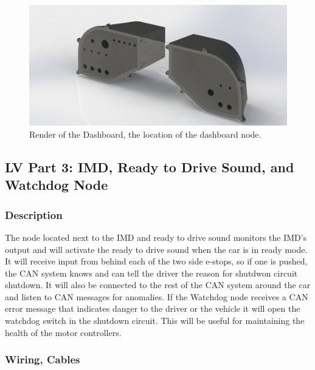 \documentclass{article}
\begin{document}
            \begin{figure}[H]
            \centering
            \includegraphics[width = 0.7 \textwidth]{Dashboard}
            \caption{Render of the Dashboard, the location of the dashboard node. }
            \label{dashboard}
            \end{figure}

    \subsection{LV Part 3: IMD, Ready to Drive Sound, and Watchdog Node} \label{imdnode}

        \subsubsection{Description}

            The node located next to the IMD and ready to drive sound monitors the IMD's output and will activate the ready to drive sound when the car is in ready mode. It will receive input from behind each of the two side e-stops, so if one is pushed, the CAN system knows and can tell the driver the reason for shutdwon circuit shutdown. It will also be connected to the rest of the CAN system around the car and listen to CAN messages for anomalies. If the Watchdog node receives a CAN error message that indicates danger to the driver or the vehicle it will open the watchdog switch in the shutdown circuit. This will be useful for maintaining the health of the motor controllers.

        \subsubsection{Wiring, Cables}
\end{document}
